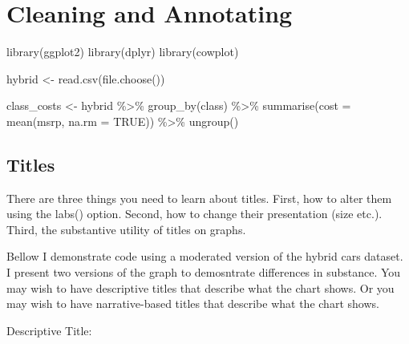 \documentclass[
  letterpaper,
  DIV=11,
  numbers=noendperiod]{scrreprt}
\newenvironment{Shaded}{\begin{snugshade}}{\end{snugshade}}
\newcommand{\AttributeTok}[1]{\textcolor[rgb]{0.40,0.45,0.13}{#1}}
\newcommand{\ConstantTok}[1]{\textcolor[rgb]{0.56,0.35,0.01}{#1}}
\newcommand{\FunctionTok}[1]{\textcolor[rgb]{0.28,0.35,0.67}{#1}}
\newcommand{\NormalTok}[1]{\textcolor[rgb]{0.00,0.23,0.31}{#1}}
\newcommand{\OtherTok}[1]{\textcolor[rgb]{0.00,0.23,0.31}{#1}}
\newcommand{\SpecialCharTok}[1]{\textcolor[rgb]{0.37,0.37,0.37}{#1}}
\begin{document}
\chapter{Cleaning and Annotating}\label{cleaning-and-annotating}

\begin{Shaded}
\begin{Highlighting}[]
\FunctionTok{library}\NormalTok{(ggplot2)}
\FunctionTok{library}\NormalTok{(dplyr)}
\FunctionTok{library}\NormalTok{(cowplot)}
\end{Highlighting}
\end{Shaded}

\begin{Shaded}
\begin{Highlighting}[]
\NormalTok{hybrid }\OtherTok{\textless{}{-}} \FunctionTok{read.csv}\NormalTok{(}\FunctionTok{file.choose}\NormalTok{())}
\end{Highlighting}
\end{Shaded}

\begin{Shaded}
\begin{Highlighting}[]
\NormalTok{class\_costs }\OtherTok{\textless{}{-}}\NormalTok{ hybrid }\SpecialCharTok{\%\textgreater{}\%}
  \FunctionTok{group\_by}\NormalTok{(class) }\SpecialCharTok{\%\textgreater{}\%}
  \FunctionTok{summarise}\NormalTok{(}\AttributeTok{cost =} \FunctionTok{mean}\NormalTok{(msrp, }\AttributeTok{na.rm =} \ConstantTok{TRUE}\NormalTok{)) }\SpecialCharTok{\%\textgreater{}\%}
  \FunctionTok{ungroup}\NormalTok{()}
\end{Highlighting}
\end{Shaded}

\section{Titles}\label{titles}

There are three things you need to learn about titles. First, how to
alter them using the labs() option. Second, how to change their
presentation (size etc.). Third, the substantive utility of titles on
graphs.

Bellow I demonstrate code using a moderated version of the hybrid cars
dataset. I present two versions of the graph to demosntrate differences
in substance. You may wish to have descriptive titles that describe what
the chart shows. Or you may wish to have narrative-based titles that
describe what the chart shows.

Descriptive Title:
\end{document}
